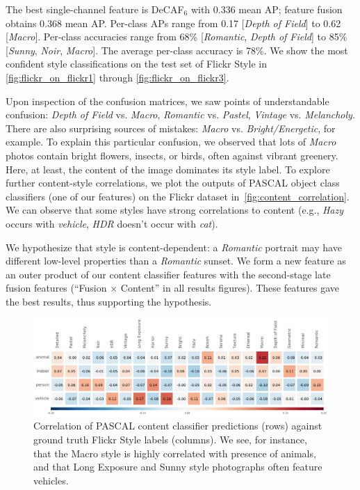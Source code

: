 The best single-channel feature is DeCAF$_6$ with 0.336 mean AP; feature fusion obtains 0.368 mean AP.
Per-class APs range from 0.17 [\emph{Depth of Field}] to  0.62 [\emph{Macro}].
Per-class accuracies range from 68\% [\emph{Romantic}, \emph{Depth of Field}] to 85\% [\emph{Sunny}, \emph{Noir}, \emph{Macro}].
The average per-class accuracy is 78\%.
We show the most confident style classifications on the test set of Flickr Style in \autoref{fig:flickr_on_flickr1} through \autoref{fig:flickr_on_flickr3}.

Upon inspection of the confusion matrices, we saw points of understandable confusion: \emph{Depth of Field} vs. \emph{Macro}, \emph{Romantic} vs. \emph{Pastel}, \emph{Vintage} vs. \emph{Melancholy}.
There are also surprising sources of mistakes: \emph{Macro} vs. \emph{Bright/Energetic}, for example.
To explain this particular confusion, we observed that lots of \emph{Macro} photos contain bright flowers, insects, or birds, often against vibrant greenery.
Here, at least, the content of the image dominates its style label.
To explore further content-style correlations, we plot the outputs of PASCAL object class classifiers (one of our features) on the Flickr dataset in~\autoref{fig:content_correlation}.
We can observe that some styles have strong correlations to content (e.g., \emph{Hazy} occurs with \emph{vehicle}, \emph{HDR} doesn't occur with \emph{cat}).

We hypothesize that style is content-dependent: a \emph{Romantic} portrait may have different low-level properties than a \emph{Romantic} sunset.
We form a new feature as an outer product of our content classifier features with the second-stage late fusion features (``Fusion $\times$ Content'' in all results figures).
These features gave the best results, thus supporting the hypothesis.

\begin{figure}[h]
\centering
    \includegraphics[width=\linewidth]{../style/figures/content_correlation2/pascal_on_flickr.pdf}
    \caption[Correlation of PASCAL content classifier predictions with ground truth Flickr Style labels.]{
        Correlation of PASCAL content classifier predictions (rows) against ground truth Flickr Style labels (columns).
        We see, for instance, that the Macro style is highly correlated with presence of animals, and that Long Exposure and Sunny style photographs often feature vehicles.
    }\label{fig:content_correlation}
\end{figure}

